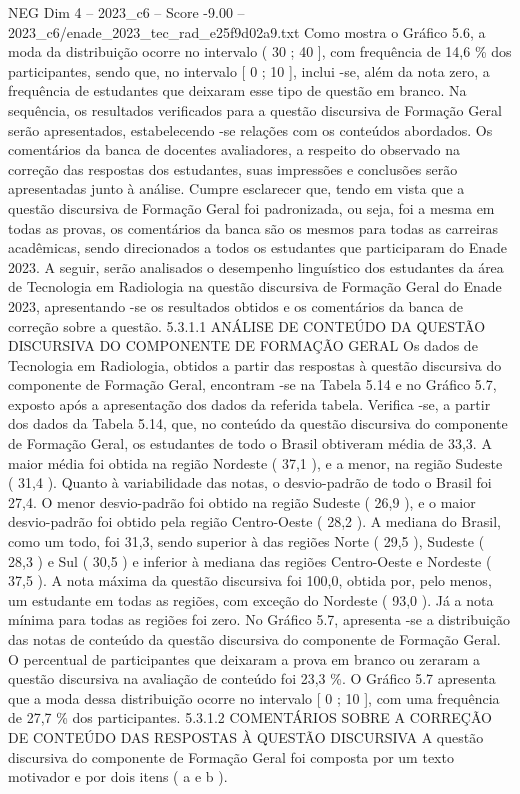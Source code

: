 \begin{textsample}{NEG Dim 4 – 2023\_c6 – Score -9.00 – 2023\_c6/enade\_2023\_tec\_rad\_e25f9d02a9.txt}
Como mostra o Gráfico 5.6, a moda da distribuição ocorre no intervalo ( 30 ; 40 ], com frequência de 14,6 \% dos participantes, sendo que, no intervalo [ 0 ; 10 ], inclui -se, além da nota zero, a frequência de estudantes que deixaram esse tipo de questão em branco.
Na sequência, os resultados verificados para a questão discursiva de Formação Geral serão apresentados, estabelecendo -se relações com os conteúdos abordados.
Os comentários da banca de docentes avaliadores, a respeito do observado na correção das respostas dos estudantes, suas impressões e conclusões serão apresentadas junto à análise.
Cumpre esclarecer que, tendo em vista que a questão discursiva de Formação Geral foi padronizada, ou seja, foi a mesma em todas as provas, os comentários da banca são os mesmos para todas as carreiras acadêmicas, sendo direcionados a todos os estudantes que participaram do Enade 2023.
A seguir, serão analisados o desempenho linguístico dos estudantes da área de Tecnologia em Radiologia na questão discursiva de Formação Geral do Enade 2023, apresentando -se os resultados obtidos e os comentários da banca de correção sobre a questão. 5.3.1.1 ANÁLISE DE CONTEÚDO DA QUESTÃO DISCURSIVA DO COMPONENTE DE FORMAÇÃO GERAL Os dados de Tecnologia em Radiologia, obtidos a partir das respostas à questão discursiva do componente de Formação Geral, encontram -se na Tabela 5.14 e no Gráfico 5.7, exposto após a apresentação dos dados da referida tabela.
Verifica -se, a partir dos dados da Tabela 5.14, que, no conteúdo da questão discursiva do componente de Formação Geral, os estudantes de todo o Brasil obtiveram média de 33,3.
A maior média foi obtida na região Nordeste ( 37,1 ), e a menor, na região Sudeste ( 31,4 ).
Quanto à variabilidade das notas, o desvio-padrão de todo o Brasil foi 27,4.
O menor desvio-padrão foi obtido na região Sudeste ( 26,9 ), e o maior desvio-padrão foi obtido pela região Centro-Oeste ( 28,2 ).
A mediana do Brasil, como um todo, foi 31,3, sendo superior à das regiões Norte ( 29,5 ), Sudeste ( 28,3 ) e Sul ( 30,5 ) e inferior à mediana das regiões Centro-Oeste e Nordeste ( 37,5 ).
A nota máxima da questão discursiva foi 100,0, obtida por, pelo menos, um estudante em todas as regiões, com exceção do Nordeste ( 93,0 ).
Já a nota mínima para todas as regiões foi zero.
No Gráfico 5.7, apresenta -se a distribuição das notas de conteúdo da questão discursiva do componente de Formação Geral.
O percentual de participantes que deixaram a prova em branco ou zeraram a questão discursiva na avaliação de conteúdo foi 23,3 \%.
O Gráfico 5.7 apresenta que a moda dessa distribuição ocorre no intervalo [ 0 ; 10 ], com uma frequência de 27,7 \% dos participantes. 5.3.1.2 COMENTÁRIOS SOBRE A CORREÇÃO DE CONTEÚDO DAS RESPOSTAS À QUESTÃO DISCURSIVA A questão discursiva do componente de Formação Geral foi composta por um texto motivador e por dois itens ( a e b ).

\end{textsample}
